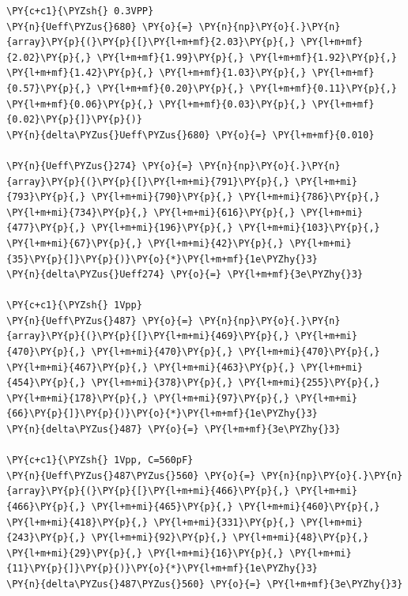     \begin{tcolorbox}[breakable, size=fbox, boxrule=1pt, pad at break*=1mm,colback=cellbackground, colframe=cellborder]
\begin{Verbatim}[commandchars=\\\{\}]
\PY{c+c1}{\PYZsh{} 0.3VPP}
\PY{n}{Ueff\PYZus{}680} \PY{o}{=} \PY{n}{np}\PY{o}{.}\PY{n}{array}\PY{p}{(}\PY{p}{[}\PY{l+m+mf}{2.03}\PY{p}{,} \PY{l+m+mf}{2.02}\PY{p}{,} \PY{l+m+mf}{1.99}\PY{p}{,} \PY{l+m+mf}{1.92}\PY{p}{,} \PY{l+m+mf}{1.42}\PY{p}{,} \PY{l+m+mf}{1.03}\PY{p}{,} \PY{l+m+mf}{0.57}\PY{p}{,} \PY{l+m+mf}{0.20}\PY{p}{,} \PY{l+m+mf}{0.11}\PY{p}{,} \PY{l+m+mf}{0.06}\PY{p}{,} \PY{l+m+mf}{0.03}\PY{p}{,} \PY{l+m+mf}{0.02}\PY{p}{]}\PY{p}{)}
\PY{n}{delta\PYZus{}Ueff\PYZus{}680} \PY{o}{=} \PY{l+m+mf}{0.010}

\PY{n}{Ueff\PYZus{}274} \PY{o}{=} \PY{n}{np}\PY{o}{.}\PY{n}{array}\PY{p}{(}\PY{p}{[}\PY{l+m+mi}{791}\PY{p}{,} \PY{l+m+mi}{793}\PY{p}{,} \PY{l+m+mi}{790}\PY{p}{,} \PY{l+m+mi}{786}\PY{p}{,} \PY{l+m+mi}{734}\PY{p}{,} \PY{l+m+mi}{616}\PY{p}{,} \PY{l+m+mi}{477}\PY{p}{,} \PY{l+m+mi}{196}\PY{p}{,} \PY{l+m+mi}{103}\PY{p}{,} \PY{l+m+mi}{67}\PY{p}{,} \PY{l+m+mi}{42}\PY{p}{,} \PY{l+m+mi}{35}\PY{p}{]}\PY{p}{)}\PY{o}{*}\PY{l+m+mf}{1e\PYZhy{}3}
\PY{n}{delta\PYZus{}Ueff274} \PY{o}{=} \PY{l+m+mf}{3e\PYZhy{}3}

\PY{c+c1}{\PYZsh{} 1Vpp}
\PY{n}{Ueff\PYZus{}487} \PY{o}{=} \PY{n}{np}\PY{o}{.}\PY{n}{array}\PY{p}{(}\PY{p}{[}\PY{l+m+mi}{469}\PY{p}{,} \PY{l+m+mi}{470}\PY{p}{,} \PY{l+m+mi}{470}\PY{p}{,} \PY{l+m+mi}{470}\PY{p}{,} \PY{l+m+mi}{467}\PY{p}{,} \PY{l+m+mi}{463}\PY{p}{,} \PY{l+m+mi}{454}\PY{p}{,} \PY{l+m+mi}{378}\PY{p}{,} \PY{l+m+mi}{255}\PY{p}{,} \PY{l+m+mi}{178}\PY{p}{,} \PY{l+m+mi}{97}\PY{p}{,} \PY{l+m+mi}{66}\PY{p}{]}\PY{p}{)}\PY{o}{*}\PY{l+m+mf}{1e\PYZhy{}3}
\PY{n}{delta\PYZus{}487} \PY{o}{=} \PY{l+m+mf}{3e\PYZhy{}3}

\PY{c+c1}{\PYZsh{} 1Vpp, C=560pF}
\PY{n}{Ueff\PYZus{}487\PYZus{}560} \PY{o}{=} \PY{n}{np}\PY{o}{.}\PY{n}{array}\PY{p}{(}\PY{p}{[}\PY{l+m+mi}{466}\PY{p}{,} \PY{l+m+mi}{466}\PY{p}{,} \PY{l+m+mi}{465}\PY{p}{,} \PY{l+m+mi}{460}\PY{p}{,} \PY{l+m+mi}{418}\PY{p}{,} \PY{l+m+mi}{331}\PY{p}{,} \PY{l+m+mi}{243}\PY{p}{,} \PY{l+m+mi}{92}\PY{p}{,} \PY{l+m+mi}{48}\PY{p}{,} \PY{l+m+mi}{29}\PY{p}{,} \PY{l+m+mi}{16}\PY{p}{,} \PY{l+m+mi}{11}\PY{p}{]}\PY{p}{)}\PY{o}{*}\PY{l+m+mf}{1e\PYZhy{}3}
\PY{n}{delta\PYZus{}487\PYZus{}560} \PY{o}{=} \PY{l+m+mf}{3e\PYZhy{}3}
\end{Verbatim}
\end{tcolorbox}

